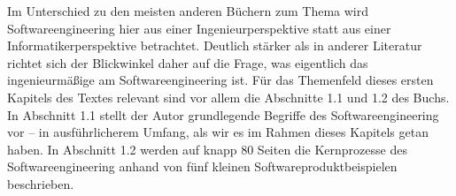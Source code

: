{Im Unterschied zu den meisten anderen Büchern zum Thema wird Softwareengineering hier aus einer Ingenieurperspektive statt aus einer Informatikerperspektive betrachtet. Deutlich stärker als in anderer Literatur richtet sich der Blickwinkel daher auf die Frage, was eigentlich das ingenieurmäßige am Softwareengineering ist. Für das Themenfeld dieses ersten Kapitels des Textes relevant sind vor allem die Abschnitte 1.1 und 1.2 des Buchs. In Abschnitt 1.1 stellt der Autor grundlegende Begriffe des Softwareengineering vor – in ausführlicherem Umfang, als wir es im Rahmen dieses Kapitels getan haben. In Abschnitt 1.2 werden auf knapp 80 Seiten die Kernprozesse des Softwareengineering anhand von fünf kleinen Softwareproduktbeispielen beschrieben.}


